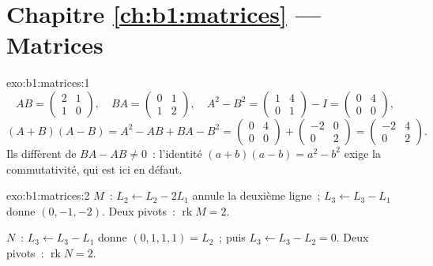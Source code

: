 \section*{Chapitre \ref{ch:b1:matrices} --- Matrices}

\begin{solution}{exo:b1:matrices:1}
\[
AB = \begin{pmatrix} 2 & 1\\ 1 & 0\end{pmatrix},
\quad
BA = \begin{pmatrix} 0 & 1\\ 1 & 2\end{pmatrix},
\quad
A^2 - B^2 = \begin{pmatrix} 1 & 4\\ 0 & 1\end{pmatrix} - I
= \begin{pmatrix} 0 & 4\\ 0 & 0\end{pmatrix},
\]
\[
(A+B)(A-B) = A^2 - AB + BA - B^2
= \begin{pmatrix} 0 & 4\\ 0 & 0\end{pmatrix} +
\begin{pmatrix} -2 & 0\\ 0 & 2 \end{pmatrix}
= \begin{pmatrix} -2 & 4\\ 0 & 2\end{pmatrix}.
\]
Ils diffèrent de $BA - AB \neq 0$~: l'identité $(a+b)(a-b) = a^2 -
b^2$ exige la commutativité, qui est ici en défaut.
\end{solution}

\begin{solution}{exo:b1:matrices:2}
$M$~: $L_2 \leftarrow L_2 - 2L_1$ annule la deuxième ligne~; $L_3
\leftarrow L_3 - L_1$ donne $(0, -1, -2)$. Deux pivots~:
$\operatorname{rk} M = 2$.

$N$~: $L_3 \leftarrow L_3 - L_1$ donne $(0,1,1,1) = L_2$~; puis $L_3
\leftarrow L_3 - L_2 = 0$. Deux pivots~: $\operatorname{rk} N = 2$.
\end{solution}

